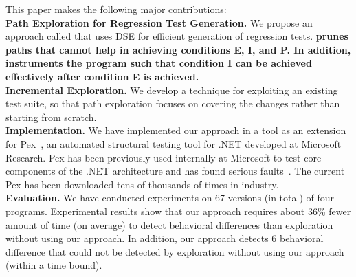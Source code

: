 {

This paper makes the following major contributions:
\\ \textbf{Path Exploration for Regression Test Generation.} We propose an approach called  that uses DSE for efficient generation of regression tests. 
\textbf{ prunes paths that cannot help in achieving conditions E, I, and P.
In addition,  instruments the program such that condition I can be achieved effectively
after condition E is achieved.} 
\\ \textbf{Incremental Exploration.} We develop a technique for exploiting an existing test suite, so that path exploration focuses on covering the changes rather than starting from scratch. 
\\ \textbf{Implementation.} We have implemented our  approach in a tool as an extension for Pex~\cite{Pex},  an automated structural testing tool for .NET developed at Microsoft Research. Pex has been previously used internally at Microsoft to test core components of the .NET architecture and has found serious
faults~\cite{Pex}. The current Pex has been downloaded tens of thousands of times in industry. 
\\ \textbf{Evaluation.} We have conducted experiments on 67 versions (in total) of four programs. 
Experimental results show that our approach requires about 36\% fewer amount of time (on average) to detect behavioral differences than exploration without using our approach. In addition, our approach detects 6 behavioral difference that could not be detected by exploration without using our approach (within a time bound).
}
